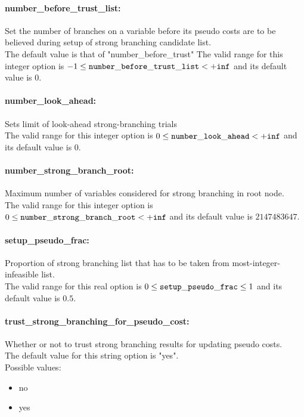 \paragraph{number\_before\_trust\_list:}\label{opt:number_before_trust_list} Set the number of branches on a variable before its pseudo costs are to be believed during setup of strong branching candidate list. \\
 The default value is that of "number\_before\_trust" The valid range for this integer option is
$-1 \le {\tt number\_before\_trust\_list } <  {\tt +inf}$
and its default value is $0$.


\paragraph{number\_look\_ahead:}\label{opt:number_look_ahead} Sets limit of look-ahead strong-branching trials \\
 The valid range for this integer option is
$0 \le {\tt number\_look\_ahead } <  {\tt +inf}$
and its default value is $0$.


\paragraph{number\_strong\_branch\_root:}\label{opt:number_strong_branch_root} Maximum number of variables considered for strong branching in root node. \\
 The valid range for this integer option is
$0 \le {\tt number\_strong\_branch\_root } <  {\tt +inf}$
and its default value is $2147483647$.


\paragraph{setup\_pseudo\_frac:}\label{opt:setup_pseudo_frac} Proportion of strong branching list that has to be taken from most-integer-infeasible list. \\
 The valid range for this real option is 
$0 \le {\tt setup\_pseudo\_frac } \le 1$
and its default value is $0.5$.


\paragraph{trust\_strong\_branching\_for\_pseudo\_cost:}\label{opt:trust_strong_branching_for_pseudo_cost} Whether or not to trust strong branching results for updating pseudo costs. \\
 The default value for this string option is "yes".
\\ 
Possible values:
\begin{itemize}
   \item no
   \item yes
\end{itemize}

